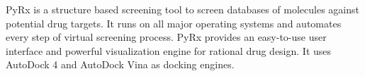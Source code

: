 PyRx is a structure based screening tool to screen databases of molecules against potential drug targets. It runs on all major operating systems and automates every step of virtual screening process. PyRx provides an easy-to-use user interface and powerful visualization engine for rational drug design. It uses AutoDock 4 and AutoDock Vina as docking engines\cite{Dallakyan_2014}. 